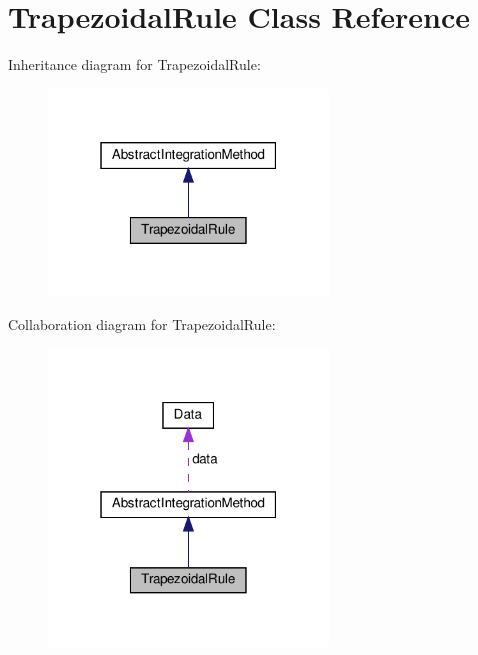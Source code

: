 \hypertarget{class_trapezoidal_rule}{}\section{Trapezoidal\+Rule Class Reference}
\label{class_trapezoidal_rule}


Inheritance diagram for Trapezoidal\+Rule\+:\nopagebreak
\begin{figure}[H]
\begin{center}
\leavevmode
\includegraphics[width=211pt]{class_trapezoidal_rule__inherit__graph}
\end{center}
\end{figure}


Collaboration diagram for Trapezoidal\+Rule\+:\nopagebreak
\begin{figure}[H]
\begin{center}
\leavevmode
\includegraphics[width=211pt]{class_trapezoidal_rule__coll__graph}
\end{center}
\end{figure}
